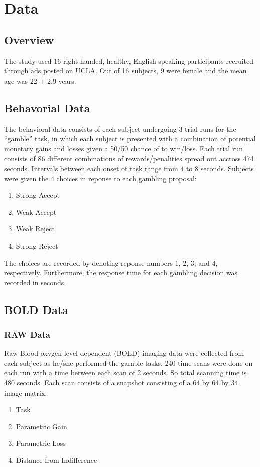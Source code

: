 \section{Data}
\subsection{Overview}
The study used 16 right-handed, healthy, English-speaking participants 
recruited through ads posted on UCLA. Out of 16 subjects, 9 were female and 
the mean age was 22 $ \pm $ 2.9 years. \cite{Tom2007LossAversion}

\subsection{Behavorial Data}
The behavioral data consists of each subject undergoing 3 trial runs for the 
``gamble'' task, in which each subject is presented with a combination of 
potential monetary gains and losses given a 50/50 chance of to win/loss. Each 
trial run consists of 86 different combinations of rewards/penalities spread 
out accross 474 seconds. Intervals between each onset of task range from 4 to 
8 seconds. Subjects were given the 4 choices in reponse to each gambling 
proposal:
\begin{enumerate}
  \item Strong Accept
  \item Weak Accept
  \item Weak Reject
  \item Strong Reject
\end{enumerate}
The choices are recorded by denoting reponse numbers 1, 2, 3, and 4, 
respectively. Furthermore, the response time for each gambling decision was 
recorded in seconds. 
\subsection{BOLD Data}
\subsubsection{RAW Data}
Raw Blood-oxygen-level dependent (BOLD) imaging data were collected from each
subject as he/she performed the gamble tasks. 240 time scans were done on each
run with a time between each scan of 2 seconds. So total scanning time is 480
seconds. Each scan consists of a snapshot consisting of a 64 by 64 by 34 image
matrix.
\begin{enumerate}
  \item Task
  \item Parametric Gain
  \item Parametric Loss
  \item Distance from Indifference
\end{enumerate}

